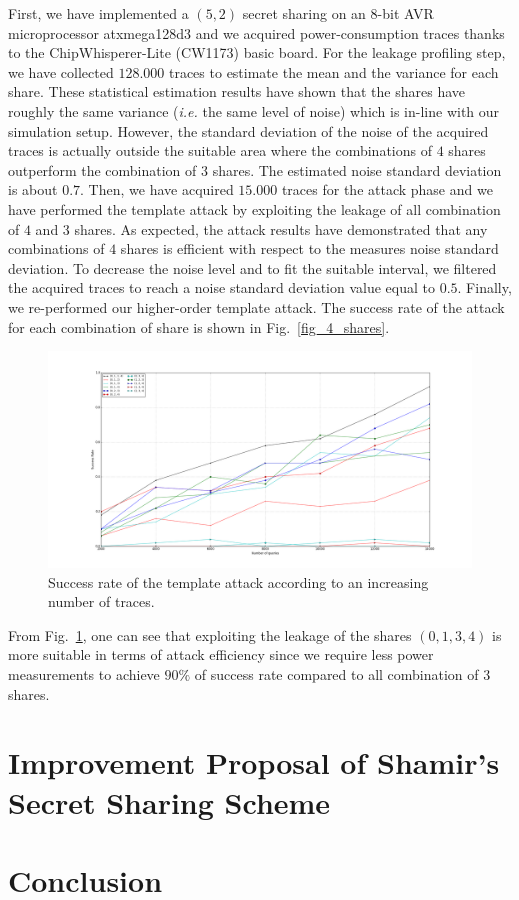 \documentclass{llncs}
\begin{document}
First, we have implemented a $(5,2)$ secret sharing on an $8$-bit AVR microprocessor atxmega128d3 and we acquired power-consumption traces thanks to the ChipWhisperer-Lite (CW1173) basic board. For the leakage profiling step, we have collected $128.000$ traces to estimate the mean and the variance for each share. These statistical estimation results have shown that the shares have roughly the same variance (\emph{i.e.} the same level of noise) which is in-line with our simulation setup. However, the standard deviation of the noise of the acquired traces is actually outside the suitable area where the combinations of $4$ shares outperform the combination of $3$ shares. The estimated noise standard deviation is about $0.7$.
Then, we have acquired $15.000$ traces for the attack phase and we have performed the template attack by exploiting the leakage of all combination of $4$ and $3$ shares. As expected, the attack results have demonstrated that any combinations of $4$ shares is efficient with respect to the measures noise standard deviation. To decrease the noise level and to fit the suitable interval, we filtered the acquired traces to reach a noise standard deviation value equal to $0.5$. Finally, we re-performed our higher-order template attack. The success rate of the attack for each combination of share is shown in Fig.~\ref{fig_4_shares}.    

\begin{figure}
\begin{center}
\includegraphics[width=1\textwidth]{Figure/SR.png}
\caption{Success rate of the template attack according to an increasing number of traces.}
\label{fig_SR}
\end{center}
\end{figure}

From Fig.~\ref{fig_SR}, one can see that exploiting the leakage of the shares $(0, 1, 3, 4)$ is more suitable in terms of attack efficiency since we require less power measurements to achieve $90\%$ of success rate compared to all combination of $3$ shares. 



\section{Improvement Proposal of Shamir's Secret Sharing Scheme}
 \todo{}


\section{Conclusion}
\label{sec-conc}
 \todo{}
 


\end{document}
